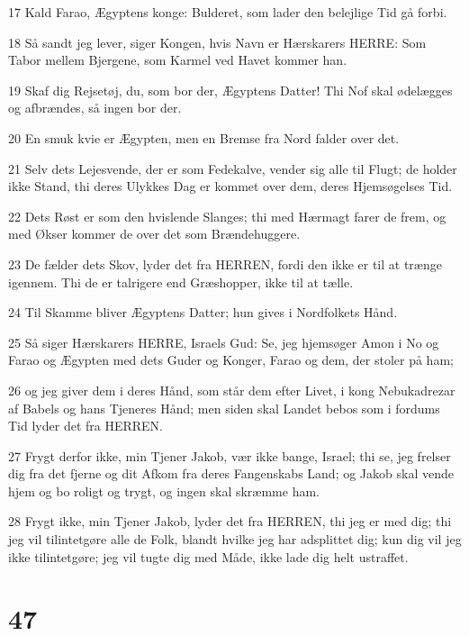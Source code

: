 \par 17 Kald Farao, Ægyptens konge: Bulderet, som lader den belejlige Tid gå forbi.
\par 18 Så sandt jeg lever, siger Kongen, hvis Navn er Hærskarers HERRE: Som Tabor mellem Bjergene, som Karmel ved Havet kommer han.
\par 19 Skaf dig Rejsetøj, du, som bor der, Ægyptens Datter! Thi Nof skal ødelægges og afbrændes, så ingen bor der.
\par 20 En smuk kvie er Ægypten, men en Bremse fra Nord falder over det.
\par 21 Selv dets Lejesvende, der er som Fedekalve, vender sig alle til Flugt; de holder ikke Stand, thi deres Ulykkes Dag er kommet over dem, deres Hjemsøgelses Tid.
\par 22 Dets Røst er som den hvislende Slanges; thi med Hærmagt farer de frem, og med Økser kommer de over det som Brændehuggere.
\par 23 De fælder dets Skov, lyder det fra HERREN, fordi den ikke er til at trænge igennem. Thi de er talrigere end Græshopper, ikke til at tælle.
\par 24 Til Skamme bliver Ægyptens Datter; hun gives i Nordfolkets Hånd.
\par 25 Så siger Hærskarers HERRE, Israels Gud: Se, jeg hjemsøger Amon i No og Farao og Ægypten med dets Guder og Konger, Farao og dem, der stoler på ham;
\par 26 og jeg giver dem i deres Hånd, som står dem efter Livet, i kong Nebukadrezar af Babels og hans Tjeneres Hånd; men siden skal Landet bebos som i fordums Tid lyder det fra HERREN.
\par 27 Frygt derfor ikke, min Tjener Jakob, vær ikke bange, Israel; thi se, jeg frelser dig fra det fjerne og dit Afkom fra deres Fangenskabs Land; og Jakob skal vende hjem og bo roligt og trygt, og ingen skal skræmme ham.
\par 28 Frygt ikke, min Tjener Jakob, lyder det fra HERREN, thi jeg er med dig; thi jeg vil tilintetgøre alle de Folk, blandt hvilke jeg har adsplittet dig; kun dig vil jeg ikke tilintetgøre; jeg vil tugte dig med Måde, ikke lade dig helt ustraffet.

\chapter{47}

